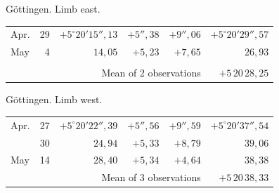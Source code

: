 \noindent\begin{minipage}[t]{.495\textwidth}\centering Göttingen. Limb east.\par\smallskip
{\scriptsize\setlength{\tabcolsep}{1pt}\renewcommand{\arraystretch}{1.2}\begin{tabular}{lr|r|r|r|r|}
Apr.&29&$+5^\circ20'15''{,}13$&$+5''{,}38$&$+9''{,}06$&$+5^\circ20'29''{,}57$\\
May&4&$14{,}05$&$+5{,}23$&$+7{,}65$&$26{,}93$\\
&&&&&\\
\cline{6-6}\multicolumn{5}{r}{Mean of 2 observations}&$+5\,20\,28{,}25$
\end{tabular}}\end{minipage}\hfill\begin{minipage}[t]{.495\textwidth}\centering Göttingen. Limb west.\par\smallskip
{\scriptsize\setlength{\tabcolsep}{1pt}\renewcommand{\arraystretch}{1.2}\begin{tabular}{lr|r|r|r|r}
Apr.&27&$+5^\circ20'22''{,}39$&$+5''{,}56$&$+9''{,}59$&$+5^\circ20'37''{,}54$\\
&30&$24{,}94$&$+5{,}33$&$+8{,}79$&$39{,}06$\\
May&14&$28{,}40$&$+5{,}34$&$+4{,}64$&$38{,}38$\\
\cline{6-6}\multicolumn{5}{r}{Mean of 3 observations}&$+5\,20\,38{,}33$
\end{tabular}}\end{minipage}
\par\vspace{4mm}

